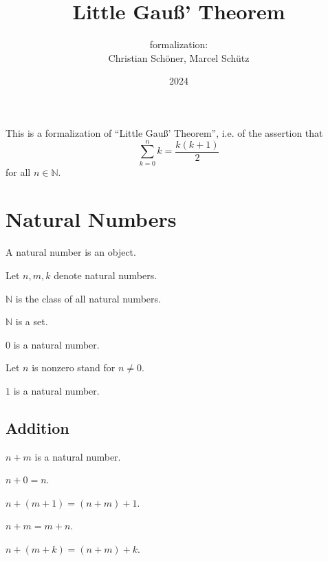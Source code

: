 \documentclass{article}
\title{Little Gauß' Theorem}
\author{\Naproche formalization:\\[0.5em]Christian Schöner, Marcel Schütz}
\date{2024}
\begin{document}
\maketitle

\noindent This is a formalization of ``Little Gauß' Theorem'', i.e. of
the assertion that
\[\sum_{k = 0}^n k = \frac{k(k + 1)}2\]
for all $n \in \mathbb{N}$.

\section{Natural Numbers}

\begin{forthel}

  \begin{signature}
    A natural number is an object.

    Let $n, m, k$ denote natural numbers.
  \end{signature}

  \begin{definition}
    $\mathbb{N}$ is the class of all natural numbers.
  \end{definition}

  \begin{axiom}
    $\mathbb{N}$ is a set.
  \end{axiom}

  \begin{signature}
    $0$ is a natural number.

    Let $n$ is nonzero stand for $n \neq 0$.
  \end{signature}

  \begin{signature}
    $1$ is a natural number.
  \end{signature}
\end{forthel}


\subsection{Addition}

\begin{forthel}
  \begin{signature}
    $n + m$ is a natural number.
  \end{signature}

  \begin{axiom}
    $n + 0 = n$.
  \end{axiom}

  \begin{axiom}
    $n + (m + 1) = (n + m) + 1$.
  \end{axiom}

  \begin{axiom}
    $n + m = m + n$.
  \end{axiom}

  \begin{axiom}
    $n + (m + k) = (n + m) + k$.
  \end{axiom}
\end{forthel}
\end{document}
